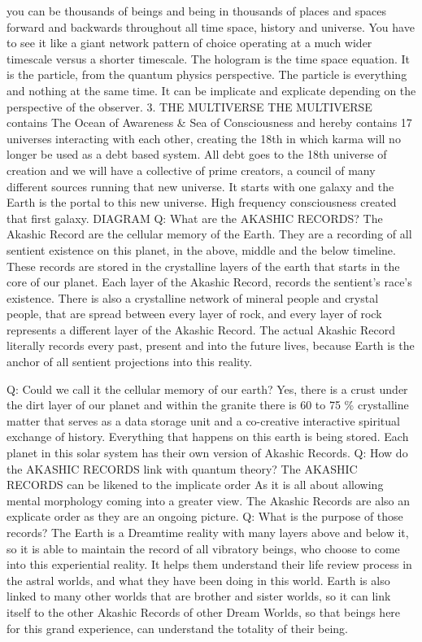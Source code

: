 you can be thousands of beings and being in thousands of places and
spaces forward and backwards throughout all time space, history and
universe. You have to see it like a giant network pattern of choice
operating at a much wider timescale versus a shorter timescale. The
hologram is the time space equation. It is the particle, from the
quantum physics perspective. The particle is everything and nothing at
the same time. It can be implicate and explicate depending on the
perspective of the observer. 3. THE MULTIVERSE THE MULTIVERSE contains
The Ocean of Awareness \& Sea of Consciousness and hereby contains 17
universes interacting with each other, creating the 18th in which karma
will no longer be used as a debt based system. All debt goes to the 18th
universe of creation and we will have a collective of prime creators, a
council of many different sources running that new universe. It starts
with one galaxy and the Earth is the portal to this new universe. High
frequency consciousness created that first galaxy. DIAGRAM Q: What are
the AKASHIC RECORDS? The Akashic Record are the cellular memory of the
Earth. They are a recording of all sentient existence on this planet, in
the above, middle and the below timeline. These records are stored in
the crystalline layers of the earth that starts in the core of our
planet. Each layer of the Akashic Record, records the sentient's race's
existence. There is also a crystalline network of mineral people and
crystal people, that are spread between every layer of rock, and every
layer of rock represents a different layer of the Akashic Record. The
actual Akashic Record literally records every past, present and into the
future lives, because Earth is the anchor of all sentient projections
into this reality.

Q: Could we call it the cellular memory of our earth? Yes, there is a
crust under the dirt layer of our planet and within the granite there is
60 to 75 \% crystalline matter that serves as a data storage unit and a
co-creative interactive spiritual exchange of history. Everything that
happens on this earth is being stored. Each planet in this solar system
has their own version of Akashic Records. Q: How do the AKASHIC RECORDS
link with quantum theory? The AKASHIC RECORDS can be likened to the
implicate order As it is all about allowing mental morphology coming
into a greater view. The Akashic Records are also an explicate order as
they are an ongoing picture. Q: What is the purpose of those records?
The Earth is a Dreamtime reality with many layers above and below it, so
it is able to maintain the record of all vibratory beings, who choose to
come into this experiential reality. It helps them understand their life
review process in the astral worlds, and what they have been doing in
this world. Earth is also linked to many other worlds that are brother
and sister worlds, so it can link itself to the other Akashic Records of
other Dream Worlds, so that beings here for this grand experience, can
understand the totality of their being.

